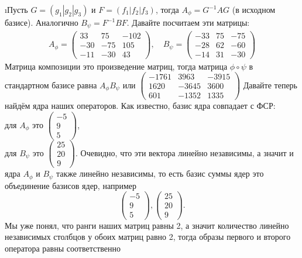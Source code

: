 \i Пусть $G = (g_1 | g_2 | g_3)$ и $F = (f_1 | f_2 | f_3)$, тогда $A_\phi = G^{-1}AG$ (в исходном базисе). Аналогично $B_\psi = F^{-1}BF$. Давайте посчитаем эти матрицы:
\begin{gather*}
    A_\phi = \begin{pmatrix}
        33 & 75 & -102\\
        -30 & -75 & 105\\
        -11 & -30 & 43
    \end{pmatrix},\quad 
    B_\psi = \begin{pmatrix}
        -33 & 75 & -75\\
        -28 & 62 & -60\\
        -14 & 31 & -30
    \end{pmatrix}
\end{gather*}
Матрица композиции это произведение матриц, тогда матрица $\phi \circ \psi$ в стандартном базисе равна $A_\phi B_\psi$ или $\begin{pmatrix}
    -1761 & 3963 & -3915\\
    1620 & -3645 & 3600\\
    601 & -1352 & 1335
\end{pmatrix}$
Давайте теперь найдём ядра наших операторов. Как известно, базис ядра совпадает с ФСР:\\
для $A_\phi$ это $\begin{pmatrix}
    -5\\9\\5
\end{pmatrix}$,\\
для $B_\psi$ это $\begin{pmatrix}
    25\\20\\9
\end{pmatrix}$.
Очевидно, что эти вектора линейно независимы, а значит и ядра $A_\phi$ и $B_\psi$ также линейно независимы, то есть базис суммы ядер это объединение базисов ядер, например
$$\begin{pmatrix}
    -5\\9\\5
\end{pmatrix},
\begin{pmatrix}
    25\\20\\9
\end{pmatrix}.$$
Мы уже понял, что ранги наших матриц равны 2, а значит количество линейно независимых столбцов у обоих матриц равно 2, тогда образы первого и второго оператора равны соответственно
